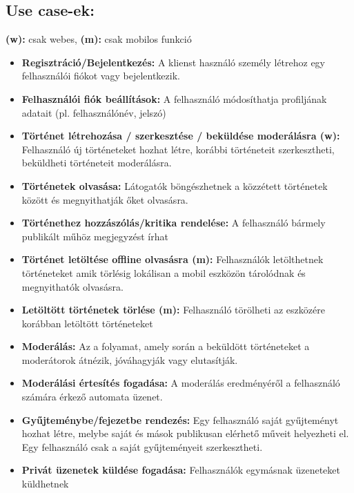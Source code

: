 \documentclass[12pt,a4paper,oneside]{article}
\begin{document}
\subsection{Use case-ek:}
\textbf{(w):} csak webes, \textbf{(m):} csak mobilos funkció
\begin{itemize}
\item \textbf{Regisztráció/Bejelentkezés:} A klienst használó személy létrehoz egy felhasználói fiókot vagy bejelentkezik.
\item \textbf{Felhasználói fiók beállítások:} A felhasználó módosíthatja profiljának adatait (pl. felhasználónév, jelszó)
\item \textbf{Történet létrehozása / szerkesztése / beküldése moderálásra (w):} Felhasználó új történeteket hozhat létre, korábbi történeteit szerkesztheti, beküldheti történeteit moderálásra.
\item \textbf{Történetek olvasása:} Látogatók böngészhetnek a közzétett történetek között és megnyithatják őket olvasásra.
\item \textbf{Történethez hozzászólás/kritika rendelése:} A felhasználó bármely publikált műhöz megjegyzést írhat
\item \textbf{Történet letöltése offline olvasásra (m):} Felhasználók letölthetnek történeteket amik törlésig lokálisan a mobil eszközön tárolódnak és megnyithatók olvasásra.  
\item \textbf{Letöltött történetek törlése (m):} Felhasználó törölheti az eszközére korábban letöltött történeteket
\item \textbf{Moderálás:} Az a folyamat, amely során a beküldött történeteket a moderátorok átnézik, jóváhagyják vagy elutasítják. 
\item \textbf{Moderálási értesítés fogadása:} A moderálás eredményéről a felhasználó számára érkező automata üzenet.
\item \textbf{Gyűjteménybe/fejezetbe rendezés:} Egy felhasználó saját gyűjteményt hozhat létre, melybe saját és mások publikusan elérhető műveit helyezheti el. Egy felhasználó csak a saját gyűjteményeit szerkesztheti. 
\item \textbf{Privát üzenetek küldése fogadása:} Felhasználók egymásnak üzeneteket küldhetnek
\end{itemize}
\end{document}
